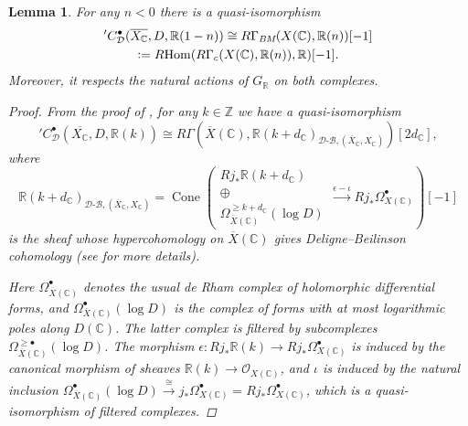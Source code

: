 \documentclass[10pt,a4paper,oneside,draft]{article}
\DeclareMathOperator{\Cone}{Cone}
\DeclareMathOperator{\Hom}{Hom}
\newcommand{\CC}{\mathbb{C}}
\newcommand{\RR}{\mathbb{R}}
\newcommand{\ZZ}{\mathbb{Z}}
\newcommand{\BM}{\text{\it BM}}
\newcommand{\DB}{{\mathcal{D}\text{-}\mathcal{B}}}
\newcommand{\dfn}{\mathrel{\mathop:}=}
\newcommand{\RHom}{R\!\Hom}
\theoremstyle{myplain}
\newtheorem{lemma}[theorem]{Lemma}
\theoremstyle{mydefinition}
\numberwithin{equation}{section}
\begin{document}
\begin{lemma}
  For any $n < 0$ there is a quasi-isomorphism
  \begin{multline*}
    {}' C^\bullet_\mathcal{D} (\overline{X_\CC}, D, \RR (1-n)) \cong
    R\Gamma_\BM (X (\CC), \RR (n)) [-1] \\
    \dfn \RHom (R\Gamma_c (X (\CC), \RR (n)), \RR) [-1].
  \end{multline*}
  Moreover, it respects the natural actions of $G_\RR$ on both complexes.

  \begin{proof}
    From the proof of \cite[Theorem~1.15]{Jannsen-1988}, for any $k \in \ZZ$ we
    have a quasi-isomorphism
    \begin{equation}
      \label{eqn:Jannsen-Theorem-1.15}
      {}' C^\bullet_\mathcal{D} (\overline{X_\CC}, D, \RR (k)) \cong
      R\Gamma (\overline{X} (\CC), \RR (k + d_\CC)_{\DB, (\overline{X}_\CC,X_\CC)}) [2d_\CC],
    \end{equation}
    where
    \[ \RR (k + d_\CC)_{\DB, (\overline{X}_\CC,X_\CC)} =
      \Cone \left(\begin{array}{c}
        R j_* \RR (k + d_\CC) \\
        \oplus \\
        \Omega^{\geqslant k + d_\CC}_{\overline{X} (\CC)} (\log D)
      \end{array}
      \xrightarrow{\epsilon - \iota}
      R j_* \Omega_{X (\CC)}^\bullet \right) [-1] \]
    is the sheaf whose hypercohomology on $\overline{X} (\CC)$ gives
    Deligne--Beilinson cohomology (see \cite{Esnault-Viehweg-1988} for
    more details).

    Here $\Omega^\bullet_{\overline{X} (\CC)}$ denotes the usual de Rham complex
    of holomorphic differential forms, and
    $\Omega^\bullet_{\overline{X} (\CC)} (\log D)$ is the complex of forms with
    at most logarithmic poles along $D (\CC)$.
    The latter complex is filtered by subcomplexes
    $\Omega^{\geqslant \bullet}_{\overline{X} (\CC)} (\log D)$.
    The morphism
    $\epsilon\colon R j_* \RR (k) \to R j_* \Omega^\bullet_{X (\CC)}$ is induced
    by the canonical morphism of sheaves $\RR (k) \to \mathcal{O}_{X (\CC)}$,
    and $\iota$ is induced by the natural inclusion
    $\Omega^\bullet_{\overline{X} (\CC)} (\log D) \xrightarrow{\cong} j_*
    \Omega_{X (\CC)}^\bullet = R j_* \Omega_{X (\CC)}^\bullet$, which is a
    quasi-isomorphism of filtered complexes.


\end{proof}
\end{lemma}
\end{document}
